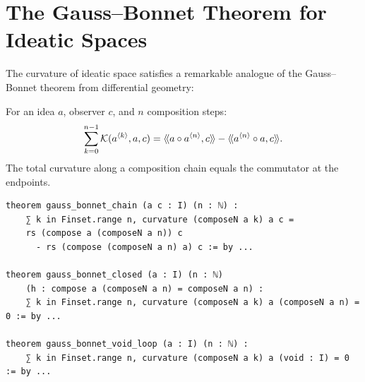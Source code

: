 \section{The Gauss--Bonnet Theorem for Ideatic Spaces}

The curvature of ideatic space satisfies a remarkable analogue of the
Gauss--Bonnet theorem from differential geometry:

\begin{theorem}
\label{thm:gauss-bonnet}
For an idea $a$, observer $c$, and $n$ composition steps:
\[
  \sum_{k=0}^{n-1} \mathcal{K}(a^{\langle k \rangle}, a, c) =
  \langle\!\langle a \circ a^{\langle n \rangle}, c \rangle\!\rangle - \langle\!\langle a^{\langle n \rangle} \circ a, c \rangle\!\rangle.
\]
The total curvature along a composition chain equals the commutator at the endpoints.
\end{theorem}

\begin{lstlisting}[caption={Gauss--Bonnet theorem (IDT\_v3\_Emergence.lean)}]
theorem gauss_bonnet_chain (a c : I) (n : ℕ) :
    ∑ k in Finset.range n, curvature (composeN a k) a c =
    rs (compose a (composeN a n)) c
      - rs (compose (composeN a n) a) c := by ...
      
theorem gauss_bonnet_closed (a : I) (n : ℕ)
    (h : compose a (composeN a n) = composeN a n) :
    ∑ k in Finset.range n, curvature (composeN a k) a (composeN a n) = 0 := by ...
    
theorem gauss_bonnet_void_loop (a : I) (n : ℕ) :
    ∑ k in Finset.range n, curvature (composeN a k) a (void : I) = 0 := by ...
\end{lstlisting}

